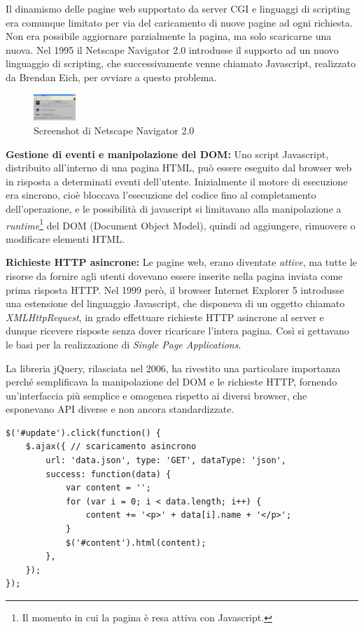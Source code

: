 Il dinamismo delle pagine web supportato da server CGI e linguaggi di
scripting era comunque limitato per via del caricamento di nuove pagine
ad ogni richiesta. Non era possibile aggiornare parzialmente la pagina,
ma solo scaricarne una nuova. Nel 1995 il Netscape Navigator 2.0
introdusse il supporto ad un nuovo linguaggio di scripting, che
successivamente venne chiamato Javascript, realizzato da Brendan Eich,
per ovviare a questo problema.

\begin{figure}
\centering
\includegraphics[width=\textwidth,height=1cm]{./res/netscape_navigator.png}
\caption{Screenshot di Netscape Navigator 2.0}
\end{figure}

\textbf{Gestione di eventi e manipolazione del DOM:} Uno script
Javascript, distribuito all'interno di una pagina HTML, può essere
eseguito dal browser web in risposta a determinati eventi dell'utente.
Inizialmente il motore di esecuzione era sincrono, cioè bloccava
l'esecuzione del codice fino al completamento dell'operazione, e le
possibilità di javascript si limitavano alla manipolazione a
\emph{runtime}\footnote{Il momento in cui la pagina è resa attiva con
  Javascript.} del DOM (Document Object Model), quindi ad aggiungere,
rimuovere o modificare elementi HTML.

\textbf{Richieste HTTP asincrone:} Le pagine web, erano diventate
\emph{attive}, ma tutte le risorse da fornire agli utenti dovevano
essere inserite nella pagina inviata come prima risposta HTTP. Nel 1999
però, il browser Internet Explorer 5 introdusse una estensione del
linguaggio Javascript, che disponeva di un oggetto chiamato
\emph{XMLHttpRequest}, in grado effettuare richieste HTTP asincrone al
server e dunque ricevere risposte senza dover ricaricare l'intera
pagina. Così si gettavano le basi per la realizzazione di \emph{Single
Page Applications}.

La libreria jQuery, rilasciata nel 2006, ha rivestito una particolare
importanza perché semplificava la manipolazione del DOM e le richieste
HTTP, fornendo un'interfaccia più semplice e omogenea rispetto ai
diversi browser, che esponevano API diverse e non ancora standardizzate.

\begin{verbatim}
$('#update').click(function() {
    $.ajax({ // scaricamento asincrono
        url: 'data.json', type: 'GET', dataType: 'json',
        success: function(data) {
            var content = '';
            for (var i = 0; i < data.length; i++) {
                content += '<p>' + data[i].name + '</p>';
            }
            $('#content').html(content);
        },
    });
});
\end{verbatim}

